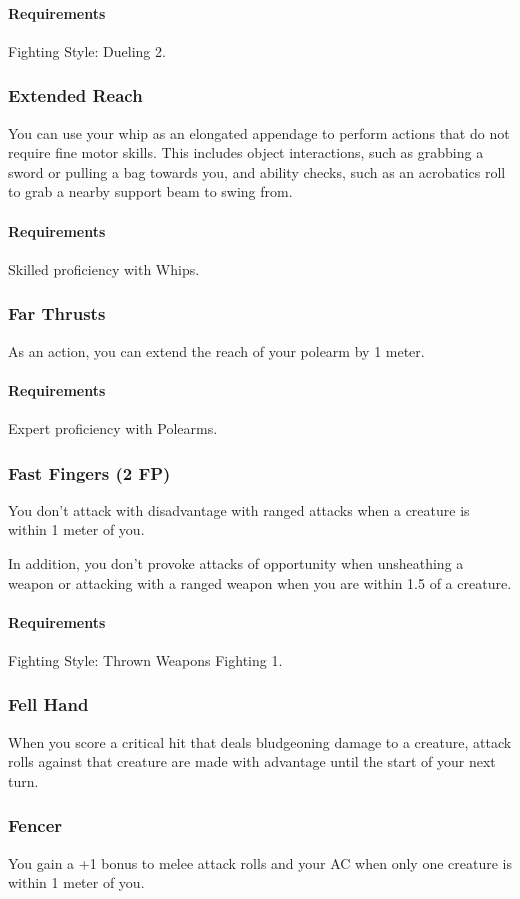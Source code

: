     \paragraph{Requirements} Fighting Style: Dueling 2.
\subsubsection{Extended Reach} \label{feat::extendedreach}
    You can use your whip as an elongated appendage to perform actions that do not require fine motor skills.
    This includes object interactions, such as grabbing a sword or pulling a bag towards you, and ability checks, such as an acrobatics roll to grab a nearby support beam to swing from.
    \paragraph{Requirements} Skilled proficiency with Whips.
\subsubsection{Far Thrusts} \label{feat::farthrusts}
    As an action, you can extend the reach of your polearm by 1 meter.
    \paragraph{Requirements} Expert proficiency with Polearms.
\subsubsection{Fast Fingers (2 FP)} \label{feat::fastfingers}
    You don't attack with disadvantage with ranged attacks when a creature is within 1 meter of you.

    In addition, you don't provoke attacks of opportunity when unsheathing a weapon or attacking with a ranged weapon when you are within 1.5 of a creature.
    \paragraph{Requirements} Fighting Style: Thrown Weapons Fighting 1.
\subsubsection{Fell Hand} \label{feat::fellhand}
    When you score a critical hit that deals bludgeoning damage to a creature, attack rolls against that creature are made with advantage until the start of your next turn.
\subsubsection{Fencer} \label{feat::fencer}
    You gain a +1 bonus to melee attack rolls and your AC when only one creature is within 1 meter of you.

